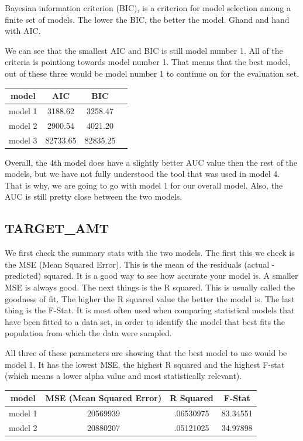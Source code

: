\documentclass[]{article}
\begin{document}
Bayesian information criterion (BIC), is a criterion for model selection
among a finite set of models. The lower the BIC, the better the model.
Ghand and hand with AIC.

We can see that the smallest AIC and BIC is still model number 1. All of
the criteria is pointiong towards model number 1. That means that the
best model, out of these three would be model number 1 to continue on
for the evaluation set.

\begin{tabular}{ c | c | c | c }
model & AIC & BIC \\
\hline
model 1 & 3188.62 & 3258.47 \\
\hline
model 2 & 2900.54 & 4021.20 \\
\hline
model 3 & 82733.65 & 82835.25 \\
\end{tabular}

Overall, the 4th model does have a slightly better AUC value then the
rest of the models, but we have not fully understood the tool that was
used in model 4. That is why, we are going to go with model 1 for our
overall model. Also, the AUC is still pretty close between the two
models.

\subsection{TARGET\_AMT}\label{targetux5famt-1}

We first check the summary stats with the two models. The first this we
check is the MSE (Mean Squared Error). This is the mean of the residuals
(actual - predicted) squared. It is a good way to see how accurate your
model is. A smaller MSE is always good. The next things is the R
squared. This is usually called the goodness of fit. The higher the R
squared value the better the model is. The last thing is the F-Stat. It
is most often used when comparing statistical models that have been
fitted to a data set, in order to identify the model that best fits the
population from which the data were sampled.

All three of these parameters are showing that the best model to use
would be model 1. It has the lowest MSE, the highest R squared and the
highest F-stat (which means a lower alpha value and most statistically
relevant).

\begin{tabular}{ c | c | c | c }
model & MSE (Mean Squared Error) & R Squared & F-Stat \\
\hline
model 1 & 20569939 & .06530975 & 83.34551 \\
\hline
model 2 & 20880207 & .05121025 & 34.97898 \\
\end{tabular}
\end{document}

